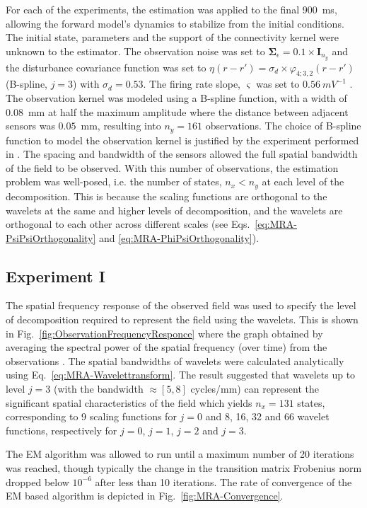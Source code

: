 \documentclass[review,authoryear,3p]{elsarticle}
\begin{document}
For each of the experiments, the estimation was applied to the final 900~ms, allowing the forward model's dynamics to stabilize from the initial conditions. The initial state, parameters and the support of the connectivity kernel were unknown to the estimator. The observation noise was set to $\boldsymbol\Sigma_{\epsilon}=0.1 \times \mathbf{I}_{n_y}$ and the disturbance covariance function was set to $\eta(r-r') = \sigma_d\times\varphi_{4;3,2}(r-r')$ (B-spline, $j=3$) with $\sigma_d=0.53$.  The firing rate slope, $\varsigma$ was set to $0.56~mV^{-1}$ \citep{Wendling2005}. The observation kernel was modeled using a B-spline function, with a width of 0.08~mm at half the maximum amplitude where the distance between adjacent sensors was $0.05$~mm, resulting into $n_y = 161$ observations. The choice of B-spline function to model the observation kernel is justified by the experiment performed in \citet{Freestone2011}. The spacing and bandwidth of the sensors allowed the full spatial bandwidth of the field to be observed.  With this number of observations, the estimation problem was well-posed, i.e. the number of states, $n_x < n_y$ at each level of the decomposition. This is because the scaling functions are orthogonal to the wavelets at the same and higher levels of decomposition, and  the wavelets are orthogonal to each other across different scales (see Eqs.~\eqref{eq:MRA-PsiPsiOrthogonality} and \eqref{eq:MRA-PhiPsiOrthogonality}).
\subsection{Experiment I}
The spatial frequency response of the observed field was used to specify the level of decomposition required to represent the field using the wavelets. This is shown in Fig.~\ref{fig:ObservationFrequencyResponce} where the graph obtained by averaging the spectral power of the spatial frequency (over time) from the observations \citep{Scerri2009}. The spatial bandwidths of wavelets were calculated analytically using Eq.~\eqref{eq:MRA-Wavelettransform}. The result suggested that wavelets up to level $j=3$ (with the bandwidth $\approx[5,8]$ cycles/mm) can represent the significant spatial characteristics of the field which yields $n_x = 131$ states, corresponding to 9 scaling functions for $j=0$ and 8, 16, 32 and 66 wavelet functions, respectively for $j=0$, $j=1$, $j=2$ and $j=3$. 


The EM algorithm was allowed to run until a maximum number of 20 iterations was reached, though typically the change in the transition matrix Frobenius norm dropped below $10^{-6}$ after less than 10 iterations. The rate of convergence of the EM based algorithm is depicted in Fig.~\ref{fig:MRA-Convergence}. 
\end{document}
